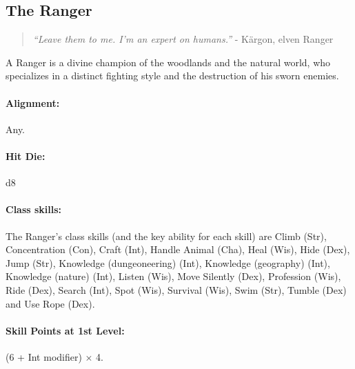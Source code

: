\subsection[Ranger]{The Ranger}
\label{sec:Ranger}
\begin{quote}
\emph{``Leave them to me. I'm an expert on humans.''}
- K\"argon, elven Ranger
\end{quote}

A Ranger is a divine champion of the woodlands and the natural world, who specializes in a distinct fighting style and the destruction of his sworn enemies.
\paragraph{Alignment:} Any.
\paragraph{Hit Die:} d8
\paragraph{Class skills:}
The Ranger's class skills (and the key ability for each skill) are Climb (Str), Concentration (Con), Craft (Int), Handle Animal (Cha), Heal (Wis), Hide (Dex), Jump (Str), Knowledge (dungeoneering) (Int), Knowledge (geography) (Int), Knowledge (nature) (Int), Listen (Wis), Move Silently (Dex), Profession (Wis), Ride (Dex), Search (Int), Spot (Wis), Survival (Wis), Swim (Str), Tumble (Dex) and Use Rope (Dex).

\paragraph{Skill Points at 1st Level:} (6 + Int modifier) $\times$ 4.
